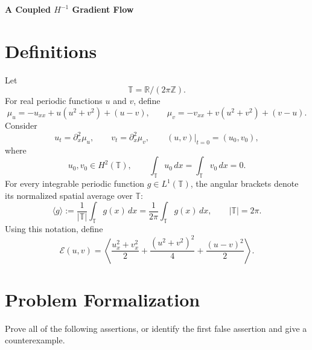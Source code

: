 \documentclass[10pt,a4paper]{article}
\theoremstyle{definition}
\begin{document}
\begin{center}
  {\Large\bfseries A Coupled $H^{-1}$ Gradient Flow}
\end{center}

\section{Definitions}

Let
\[
  \mathbb T=\mathbb R/(2\pi\mathbb Z).
\]
For real periodic functions $u$ and $v$, define
\begin{equation}
  \mu_u=-u_{xx}+u(u^2+v^2)+(u-v),
  \qquad
  \mu_v=-v_{xx}+v(u^2+v^2)+(v-u).
\end{equation}
Consider
\begin{equation}
  u_t=\partial_x^2\mu_u,
  \qquad
  v_t=\partial_x^2\mu_v,
  \qquad
  (u,v)|_{t=0}=(u_0,v_0),
\end{equation}
where
\begin{equation}
  u_0,v_0\in H^2(\mathbb T),
  \qquad
  \int_{\mathbb T}u_0\,dx
  =
  \int_{\mathbb T}v_0\,dx
  =0.
\end{equation}
For every integrable periodic function $g\in L^1(\mathbb T)$, the angular
brackets denote its normalized spatial average over $\mathbb T$:
\begin{equation}
  \langle g\rangle
  :=
  \frac{1}{|\mathbb T|}\int_{\mathbb T}g(x)\,dx
  =
  \frac{1}{2\pi}\int_{\mathbb T}g(x)\,dx,
  \qquad |\mathbb T|=2\pi.
\end{equation}
Using this notation, define
\begin{equation}
  \mathcal E(u,v)
  =
  \left\langle
    \frac{u_x^2+v_x^2}{2}
    +\frac{(u^2+v^2)^2}{4}
    +\frac{(u-v)^2}{2}
  \right\rangle.
\end{equation}

\section{Problem Formalization}

Prove all of the following assertions, or identify the first false assertion
and give a counterexample.
\end{document}
